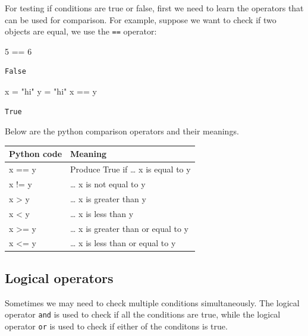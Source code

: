 \documentclass[
  letterpaper,
  DIV=11,
  numbers=noendperiod]{scrreprt}
\newenvironment{Shaded}{\begin{snugshade}}{\end{snugshade}}
\newcommand{\DecValTok}[1]{\textcolor[rgb]{0.68,0.00,0.00}{#1}}
\newcommand{\NormalTok}[1]{\textcolor[rgb]{0.00,0.23,0.31}{#1}}
\newcommand{\OperatorTok}[1]{\textcolor[rgb]{0.37,0.37,0.37}{#1}}
\newcommand{\StringTok}[1]{\textcolor[rgb]{0.13,0.47,0.30}{#1}}
\begin{document}
For testing if conditions are true or false, first we need to learn the
operators that can be used for comparison. For example, suppose we want
to check if two objects are equal, we use the \texttt{==} operator:

\begin{Shaded}
\begin{Highlighting}[]
\DecValTok{5} \OperatorTok{==} \DecValTok{6}
\end{Highlighting}
\end{Shaded}

\begin{verbatim}
False
\end{verbatim}

\begin{Shaded}
\begin{Highlighting}[]
\NormalTok{x }\OperatorTok{=} \StringTok{"hi"}
\NormalTok{y }\OperatorTok{=} \StringTok{"hi"}
\NormalTok{x }\OperatorTok{==}\NormalTok{ y}
\end{Highlighting}
\end{Shaded}

\begin{verbatim}
True
\end{verbatim}

Below are the python comparison operators and their meanings.

\begin{longtable}[]{@{}ll@{}}
\toprule\noalign{}
Python code & Meaning \\
\midrule\noalign{}
\endhead
\bottomrule\noalign{}
\endlastfoot
x == y & Produce True if \ldots{} x is equal to y \\
x != y & \ldots{} x is not equal to y \\
x \textgreater{} y & \ldots{} x is greater than y \\
x \textless{} y & \ldots{} x is less than y \\
x \textgreater= y & \ldots{} x is greater than or equal to y \\
x \textless= y & \ldots{} x is less than or equal to y \\
\end{longtable}

\hypertarget{logical-operators}{%
\subsection{Logical operators}\label{logical-operators}}

Sometimes we may need to check multiple conditions simultaneously. The
logical operator \texttt{and} is used to check if all the conditions are
true, while the logical operator \texttt{or} is used to check if either
of the conditons is true.
\end{document}
